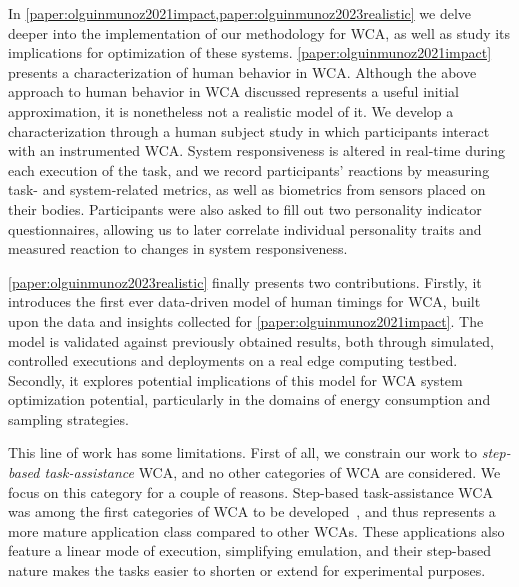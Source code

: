In \cref{paper:olguinmunoz2021impact,paper:olguinmunoz2023realistic} we delve deeper into the implementation of our methodology for \gls{WCA}, as well as study its implications for optimization of these systems.
\cref{paper:olguinmunoz2021impact} presents a characterization of human behavior in \gls{WCA}.
Although the above approach to human behavior in \gls{WCA} discussed represents a useful initial approximation, it is nonetheless not a realistic model of it.
We develop a characterization through a human subject study in which participants interact with an instrumented \gls{WCA}.
System responsiveness is altered in real-time during each execution of the task, and we record participants' reactions by measuring task- and system-related metrics, as well as biometrics from sensors placed on their bodies.
Participants were also asked to fill out two personality indicator questionnaires, allowing us to later correlate individual personality traits and measured reaction to changes in system responsiveness.

\cref{paper:olguinmunoz2023realistic} finally presents two contributions.
Firstly, it introduces the first ever data-driven model of human timings for \gls{WCA}, built upon the data and insights collected for \cref{paper:olguinmunoz2021impact}.
The model is validated against previously obtained results, both through simulated, controlled executions and deployments on a real edge computing testbed.
Secondly, it explores potential implications of this model for \gls{WCA} system optimization potential, particularly in the domains of energy consumption and sampling strategies.

\medskip

This line of work has some limitations.
First of all, we constrain our work to \emph{step-based task-assistance} \gls{WCA}, and no other categories of \gls{WCA} are considered.
We focus on this category for a couple of reasons.
Step-based task-assistance \gls{WCA} was among the first categories of \gls{WCA} to be developed~\cite{chen2015early}, and thus represents a more mature application class compared to other \glspl{WCA}.
These applications also feature a linear mode of execution, simplifying emulation, and their step-based nature makes the tasks easier to shorten or extend for experimental purposes.

